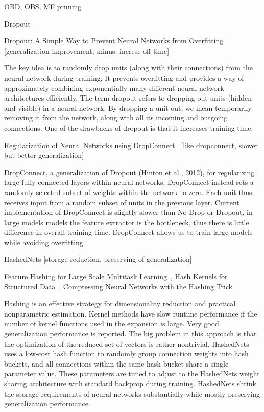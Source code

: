 \documentclass{article} %
\begin{document}
OBD, OBS, MF pruning

Dropout 

Dropout: A Simple Way to Prevent Neural Networks from Overfitting~\cite{srivastava2014dropout} [generalization improvement, minus: increse off time]

The key idea is to randomly drop units (along with their connections) from the neural network during training. It prevents overfitting and provides a way of approximately combining exponentially many different neural network architectures efficiently. The term dropout refers to dropping out units (hidden and visible) in a neural network. By dropping a unit out, we mean temporarily removing it from the network, along with all its incoming and outgoing connections. One of the drawbacks of dropout is that it increases training time.

Regularization of Neural Networks using DropConnect~\cite{wan2013regularization} [like dropconnect, slower but better generalization]

DropConnect, a generalization of Dropout (Hinton et al., 2012), for regularizing large fully-connected layers within neural networks. DropConnect instead sets a randomly selected subset of weights within the network to zero. Each unit thus receives input from a random subset of units in the previous layer. Current implementation of DropConnect is slightly slower than No-Drop or Dropout, in large models models the feature extractor is the bottleneck, thus there is little difference in overall training time. DropConnect allows us to train large models while avoiding overfitting.

HashedNets [storage reduction, preserving of generalization]

Feature Hashing for Large Scale Multitask Learning~\cite{weinberger2009feature}, Hash Kernels for Structured Data~\cite{shi2009hash}, Compressing Neural Networks with the Hashing Trick~\cite{chen2015compressing}

Hashing is an effective strategy for dimensionality reduction and practical nonparametric estimation. Kernel methods have slow runtime performance if the number of kernel functions used in the expansion is large. Very good generalization performance is reported. The big problem in this approach is that the optimization of the reduced set of vectors is rather nontrivial. HashedNets uses a low-cost hash function to randomly group connection weights into hash buckets, and all connections within the same hash bucket share a single parameter value. These parameters are tuned to adjust to the HashedNets weight sharing architecture with standard backprop during training. HashedNets shrink the storage requirements of neural networks substantially while mostly preserving generalization performance. 
\end{document}
